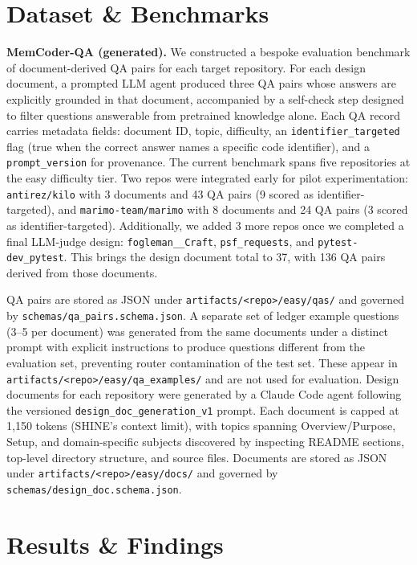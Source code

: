 \documentclass[conference,10.5pt]{IEEEtran}
\begin{document}
\section{Dataset \& Benchmarks}

\textbf{MemCoder-QA (generated).}  We constructed a bespoke evaluation
benchmark of document-derived QA pairs for each target repository.  For
each design document, a prompted LLM agent produced three QA pairs whose
answers are explicitly grounded in that document, accompanied by a
self-check step designed to filter questions answerable from pretrained
knowledge alone.  Each QA record carries metadata fields: document ID,
topic, difficulty, an \texttt{identifier\_targeted} flag (true when the
correct answer names a specific code identifier), and a
\texttt{prompt\_version} for provenance.
The current benchmark spans five repositories at the easy difficulty
tier. Two repos were integrated early for pilot experimentation: \texttt{antirez/kilo} with 3 documents and 43 QA pairs (9 scored
as identifier-targeted), and \texttt{marimo-team/marimo} with 8 documents
and 24 QA pairs (3 scored as identifier-targeted).  Additionally, we added 3 more repos once we completed a final LLM-judge design: \texttt{fogleman\_\_Craft}, \texttt{psf\_requests}, and \texttt{pytest-dev\_pytest}. This brings the design document total to 37, with 136 QA pairs derived from those documents.

QA pairs are stored
as JSON under \texttt{artifacts/<repo>/easy/qas/} and governed by
\texttt{schemas/qa\_pairs.schema.json}.
A separate set of ledger example questions (3–5 per document) was
generated from the same documents under a distinct prompt with explicit
instructions to produce questions different from the evaluation set,
preventing router contamination of the test set.  These appear in
\texttt{artifacts/<repo>/easy/qa\_examples/} and are not used for
evaluation.
Design documents for each repository were generated by a Claude Code 
agent following the versioned \texttt{design\_doc\_generation\_v1} prompt.
Each document is capped at 1,150 tokens (SHINE's context limit), with 
topics spanning Overview/Purpose, Setup, and domain-specific subjects 
discovered by inspecting README sections, top-level directory structure, 
and source files.
Documents are stored as JSON under \texttt{artifacts/<repo>/easy/docs/}
and governed by \texttt{schemas/design\_doc.schema.json}.


\section{Results \& Findings}
\label{sec:results}
\end{document}
